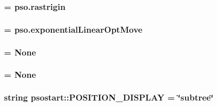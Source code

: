 \hypertarget{namespacepsostart_03fea5b845e55f82f3c7d947c79222b0}{
\subsubsection{ = {\bf pso.rastrigin}}}
\label{namespacepsostart_03fea5b845e55f82f3c7d947c79222b0}


\hypertarget{namespacepsostart_1580bebace469bf87b3e2c861e983cbc}{
\subsubsection{ = {\bf pso.exponentialLinearOptMove}}}
\label{namespacepsostart_1580bebace469bf87b3e2c861e983cbc}


\hypertarget{namespacepsostart_212b7e52d588d863bbc6b9f2dc1a302a}{
\subsubsection{ = None}}
\label{namespacepsostart_212b7e52d588d863bbc6b9f2dc1a302a}


\hypertarget{namespacepsostart_be59abaa2019ac92419e98b269eb793d}{
\subsubsection{ = None}}
\label{namespacepsostart_be59abaa2019ac92419e98b269eb793d}


\hypertarget{namespacepsostart_af21f1269d56b7712e089a0f3ac34417}{
\subsubsection{\setlength{\rightskip}{0pt plus 5cm}string {\bf psostart::POSITION\_\-DISPLAY} = \char`\"{}subtree\char`\"{}}}
\label{namespacepsostart_af21f1269d56b7712e089a0f3ac34417}


